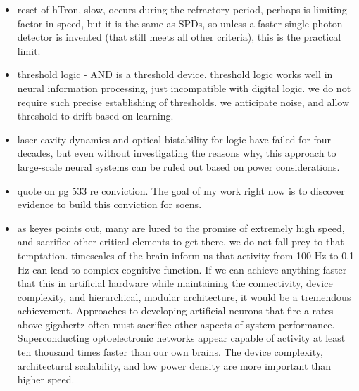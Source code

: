 \documentclass[twocolumn]{article}
\begin{document}
\begin{itemize}
\item reset of hTron, slow, occurs during the refractory period, perhaps is limiting factor in speed, but it is the same as SPDs, so unless a faster single-photon detector is invented (that still meets all other criteria), this is the practical limit.
\item threshold logic - AND is a threshold device. threshold logic works well in neural information processing, just incompatible with digital logic. we do not require such precise establishing of thresholds. we anticipate noise, and allow threshold to drift based on learning. 
\item laser cavity dynamics and optical bistability for logic have failed for four decades, but even without investigating the reasons why, this approach to large-scale neural systems can be ruled out based on power considerations. 
\item \cite{ke1985b} quote on pg 533 re conviction. The goal of my work right now is to discover evidence to build this conviction for soens.
\item as keyes points out, many are lured to the promise of extremely high speed, and sacrifice other critical elements to get there. we do not fall prey to that temptation. timescales of the brain inform us that activity from 100 Hz to 0.1 Hz can lead to complex cognitive function. If we can achieve anything faster that this in artificial hardware while maintaining the connectivity, device complexity, and hierarchical, modular architecture, it would be a tremendous achievement. Approaches to developing artificial neurons that fire a rates above gigahertz often must sacrifice other aspects of system performance. Superconducting optoelectronic networks appear capable of activity at least ten thousand times faster than our own brains. The device complexity, architectural scalability, and low power density are more important than higher speed. 
\end{itemize}
\end{document}

